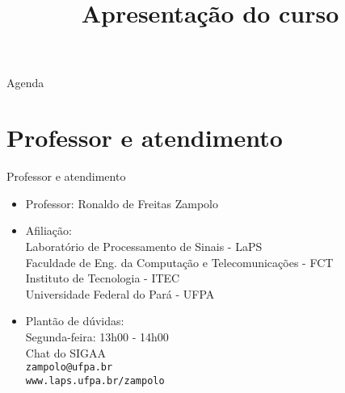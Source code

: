 




\title{\cursogrande\\ \vspace{1cm}Apresentação do curso}


   
   \maketitle[randomdots={false}]
   \begin{slide}{Agenda}
      \tableofcontents[content=sections]
   \end{slide}

   \section[ slide = true]{Professor e atendimento}
      \begin{slide}[toc=]{Professor e atendimento}
         \begin{itemize}
            \item Professor: Ronaldo de Freitas Zampolo
            \item Afiliação:\\
                  Laboratório de Processamento de Sinais - LaPS\\
                  Faculdade de Eng. da Computação e Telecomunicações - FCT\\
                  Instituto de Tecnologia - ITEC\\
                  Universidade Federal do Pará - UFPA
            \item Plantão de dúvidas:\\
                  Segunda-feira: 13h00 - 14h00\\
                  Chat do SIGAA\\
                  \texttt{zampolo@ufpa.br}\\ 
                  \texttt{www.laps.ufpa.br/zampolo}
         \end{itemize}
      \end{slide}
      
